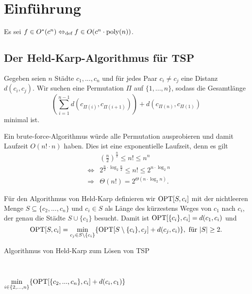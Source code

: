 \chapter{Einführung}

  Es sei \(f \in O^*(c^n) \Leftrightarrow_\text{def} f \in O(c^n \cdot \text{poly}(n))\).

\section{Der Held-Karp-Algorithmus für TSP}

  Gegeben seien \(n\) Städte \(c_1, ..., c_n\) und für jedes Paar \(c_i \neq c_j\) eine Distanz \(d(c_i,c_j)\). Wir suchen eine Permutation \(\Pi\) auf \(\{1,...,n\}\), sodass die Gesamtlänge \[\left( \sum_{i=1}^{n-1} d(c_{\Pi(i)},c_{\Pi(i+1)}) \right) + d(c_{\Pi(n)},c_{\Pi(1)})\] minimal ist.

  Ein brute-force-Algorithmus würde alle Permutation ausprobieren und damit Laufzeit \(O(n! \cdot n)\) haben. Dies ist eine exponentielle Laufzeit, denn es gilt
  \begin{eqnarray*}
    && \left(\frac{n}{2}\right)^\frac{n}{2} \leq n! \leq n^n \\
    &\Leftrightarrow& 2^{\frac{n}{2} \cdot \log_2 \frac{n}{2}} \leq n! \leq 2^{n \cdot \log_2 n} \\
    &\Rightarrow& \Theta(n!) = 2^{\Theta(n \cdot \log_2 n)}.
  \end{eqnarray*}

  Für den Algorithmus von Held-Karp definieren wir \(\text{OPT}[S,c_i]\) mit der nichtleeren Menge \(S \subseteq \{ c_2, ..., c_n \}\) und \(c_i \in S\) als Länge des kürzestens Weges von \(c_1\) nach \(c_i\), der genau die Städte \(S \cup \{ c_1 \}\) besucht. Damit ist \(\text{OPT}[\{c_i\},c_i] = d(c_1,c_i)\) und \[\text{OPT}[S,c_i] = \min_{c_j \in S \setminus \{c_i\}} \{ \text{OPT}[S \setminus \{ c_i \}, c_j ] + d(c_j,c_i)\}, \text{ für } |S| \geq 2.\]

  \begin{algorithm}[H]
    \caption{Algorithmus von Held-Karp zum Lösen von TSP}

     \\



    \Return \(\displaystyle \min_{i \in \{2,...,n\}} \{ \text{OPT}[\{c_2,...,c_n\},c_i] + d(c_i,c_1) \}\)
  \end{algorithm}

